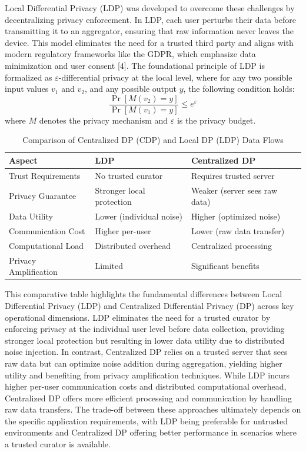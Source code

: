 \documentclass[conference]{IEEEtran}
\begin{document}
Local Differential Privacy (LDP) was developed to overcome these challenges by decentralizing privacy enforcement. In LDP, each user perturbs their data before transmitting it to an aggregator, ensuring that raw information never leaves the device. This model eliminates the need for a trusted third party and aligns with modern regulatory frameworks like the GDPR, which emphasize data minimization and user consent [4]. The foundational principle of LDP is formalized as $\varepsilon$-differential privacy at the local level, where for any two possible input values $v_1$ and $v_2$, and any possible output $y$, the following condition holds:
\begin{equation*}
\frac{\Pr[M(v_2) = y]}{\Pr[M(v_1) = y]} \leq e^{\varepsilon}
\end{equation*}
where $M$ denotes the privacy mechanism and $\varepsilon$ is the privacy budget.

\begin{table}[h]
\centering
\renewcommand{\arraystretch}{1.8} 
\caption{Comparison of Centralized DP (CDP) and Local DP (LDP) Data Flows}
\begin{tabular}{|p{2.5cm}|p{2.5cm}|p{2.5cm}|}
\hline
\textbf{Aspect} & \textbf{LDP} & \textbf{Centralized DP} \\
\hline
Trust Requirements & No trusted curator & Requires trusted server \\
\hline
Privacy Guarantee & Stronger local protection & Weaker (server sees raw data) \\
\hline
Data Utility & Lower (individual noise) & Higher (optimized noise) \\
\hline
Communication Cost & Higher per-user & Lower (raw data transfer) \\
\hline
Computational Load & Distributed overhead & Centralized processing \\
\hline
Privacy Amplification & Limited & Significant benefits \\
\hline
\end{tabular}
\end{table}

This comparative table highlights the fundamental differences between Local Differential Privacy (LDP) and Centralized Differential Privacy (DP) across key operational dimensions. LDP eliminates the need for a trusted curator by enforcing privacy at the individual user level before data collection, providing stronger local protection but resulting in lower data utility due to distributed noise injection. In contrast, Centralized DP relies on a trusted server that sees raw data but can optimize noise addition during aggregation, yielding higher utility and benefiting from privacy amplification techniques. While LDP incurs higher per-user communication costs and distributed computational overhead, Centralized DP offers more efficient processing and communication by handling raw data transfers. The trade-off between these approaches ultimately depends on the specific application requirements, with LDP being preferable for untrusted environments and Centralized DP offering better performance in scenarios where a trusted curator is available.
\end{document}
